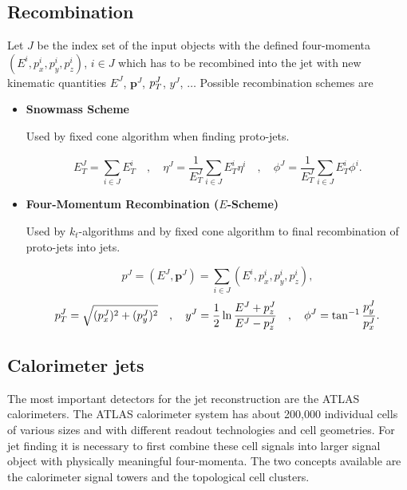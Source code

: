 \subsection{Recombination}
\label{sse:Recombination}

Let $J$ be the index set of the input objects with the defined four-momenta
$(E^i,p_x^i,p_y^i,p_z^i)$, $i \in J$ which has to be recombined into the jet
with new kinematic quantities $E^J$, $\mathbf{p}^J$, $p_{T}^J$, $y^J$, $\ldots$
Possible recombination schemes are

\begin{itemize}
\item \textbf{Snowmass Scheme}

Used by fixed cone algorithm when finding proto-jets.

\begin{equation}
  E_T^J = \sum_{i \in J} E_T^i
  \quad , \quad
  \eta^J = \frac{1}{E_T^J} \sum_{i \in J} E_T^i \eta^i
  \quad , \quad
  \phi^J = \frac{1}{E_T^J} \sum_{i \in J} E_T^i \phi^i.
\end{equation}

\item \textbf{Four-Momentum Recombination ($E$-Scheme)}

Used by $k_t$-algorithms and by fixed cone algorithm to final recombination of
proto-jets into jets.

\begin{equation}
  p^J = ( E^J, \mathbf{p}^J ) = \sum_{i \in J} (E^i,p_x^i,p_y^i,p_z^i),
\end{equation}
\begin{equation}
  p_{T}^J = \sqrt{(p_x^J)^2 + (p_y^J)^2}
  \quad , \quad
  y^J = \frac{1}{2} \ln \frac{E^J + p_z^J}{E^J - p_z^J}
  \quad , \quad
  \phi^J = \tan^{-1} \frac{p_y^J}{p_x^J}.
\end{equation}
\end{itemize}

\subsection{Calorimeter jets}
\label{sse:CalorimeterJets}

The most important detectors for the jet reconstruction are the ATLAS calorimeters.
The ATLAS calorimeter system has about 200,000 individual cells of various sizes
and with different readout technologies and cell geometries. For jet finding it
is necessary to first combine these cell signals into larger signal object with
physically meaningful four-momenta. The two concepts available are the calorimeter
signal towers and the topological cell clusters.

